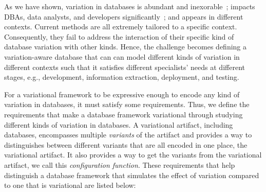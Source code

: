 As we have shown, 
variation in databases is abundant and inexorable~\cite{dbDecay16Stonebraker};
impacts DBAs, data analysts, and developers significantly~\cite{dbSPLevolve}; 
and appears in different contexts. Current methods
are all extremely tailored to a specific context. Consequently, they fail to address
the interaction of their specific kind of database variation with other kinds.
Hence, the challenge becomes defining a variation-aware database that can 
can model different kinds of variation
in different contexts such that it satisfies different specialists' needs at different stages,
e.g., development, information extraction, deployment, and testing. 

For a variational framework  to be expressive enough to encode
any kind of variation in databases, it must satisfy some requirements.
Thus, we define the requirements that make a database framework
variational through studying different kinds of variation in databases.  
A variational artifact, including databases, encompasses multiple 
\emph{variants} of the artifact and provides a way to distinguishes 
between different variants that are all encoded in one place, the 
variational artifact. It also provides a way to get the variants from
the variational artifact, we call this \emph{configuration function}.
%
These requirements that help distinguish a database framework that 
simulates the effect of variation compared to one that is variational are
listed below:

